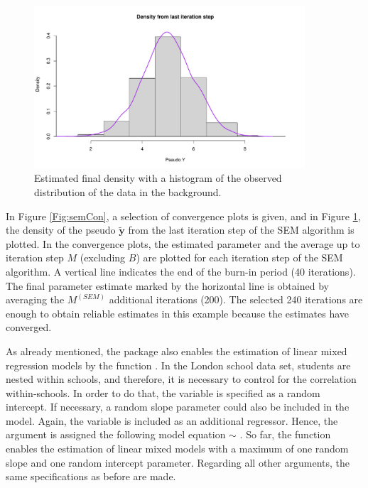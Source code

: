 \begin{figure}[ht]
  \centering
    \includegraphics[width=0.9\textwidth]{densReg.pdf}
     \caption{Estimated final density with a histogram of the observed distribution of the data in the background.}
     \label{Fig:semDen}
\end{figure}

In Figure \ref{Fig:semCon}, a selection of convergence plots is given, and in Figure \ref{Fig:semDen}, the density of the pseudo  \(\mathbf{\tilde{y}}\) from the last iteration step of the SEM algorithm is plotted. In the convergence plots, the estimated parameter and the average up to iteration step \(M\) (excluding \(B\)) are plotted for each iteration step of the SEM algorithm. A vertical line indicates the end of the burn-in period (40 iterations). The final parameter estimate marked by the horizontal line is obtained by averaging the \(M^{(SEM)}\) additional iterations (200). The selected 240 iterations are enough to obtain reliable estimates in this example because the estimates have converged.

As already mentioned, the  package also enables the estimation of linear mixed regression models by the function . In the London school data set, students are nested within schools, and therefore, it is necessary to control for the correlation within-schools. In order to do that, the variable  is specified as a random intercept. If necessary, a random slope parameter could also be included in the model. Again, the variable  is included as an additional regressor. Hence, the  argument is assigned the following model equation  \(\sim\) . So far, the function  enables the estimation of linear mixed models with a maximum of one random slope and one random intercept parameter. Regarding all other arguments, the same specifications as before are made.


